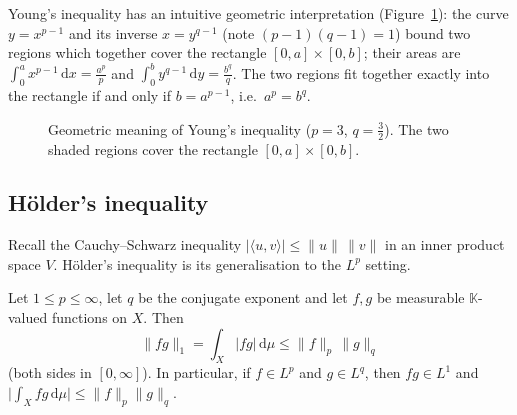 \documentclass[11pt]{article}
\newcommand{\K}{\mathbb{K}}
\newcommand{\norm}[1]{\lVert #1\rVert}
\newcommand{\dmu}{\,\mathrm{d}\mu}
\newcommand{\dx}{\,\mathrm{d}x}
\begin{document}
\begin{remark}
Young's inequality has an intuitive geometric interpretation (Figure~\ref{fig:young}): the curve $y=x^{p-1}$ and its inverse $x=y^{q-1}$ (note $(p-1)(q-1)=1$) bound two regions which together cover the rectangle $[0,a]\times[0,b]$; their areas are $\int_{0}^{a}x^{p-1}\dx=\frac{a^{p}}{p}$ and $\int_{0}^{b}y^{q-1}\,\mathrm{d}y=\frac{b^{q}}{q}$. The two regions fit together exactly into the rectangle if and only if $b=a^{p-1}$, i.e.\ $a^{p}=b^{q}$.
\end{remark}

\begin{figure}[H]
\centering
{}
\caption{Geometric meaning of Young's inequality ($p=3$, $q=\tfrac32$). The two shaded regions cover the rectangle $[0,a]\times[0,b]$.}
\label{fig:young}
\end{figure}

\subsection{Hölder's inequality}

Recall the Cauchy--Schwarz inequality $|\langle u,v\rangle|\le\norm{u}\,\norm{v}$ in an inner product space $V$. Hölder's inequality is its generalisation to the $L^{p}$ setting.

\begin{theorem}\label{thm:holder}
Let $1\le p\le\infty$, let $q$ be the conjugate exponent and let $f,g$ be measurable $\K$-valued functions on $X$. Then
\[
\norm{fg}_{1}=\int_{X}|fg|\dmu\le\norm{f}_{p}\,\norm{g}_{q}
\]
(both sides in $[0,\infty]$). In particular, if $f\in L^{p}$ and $g\in L^{q}$, then $fg\in L^{1}$ and $\bigl|\int_{X}fg\dmu\bigr|\le\norm{f}_{p}\norm{g}_{q}$.
\end{theorem}
\end{document}
